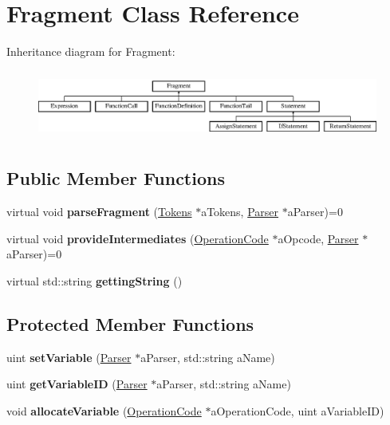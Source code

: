 \hypertarget{a00008}{\section{Fragment Class Reference}
\label{a00008}
}
Inheritance diagram for Fragment\+:\begin{figure}[H]
\begin{center}
\leavevmode
\includegraphics[height=2.295082cm]{d4/dee/a00008}
\end{center}
\end{figure}
\subsection*{Public Member Functions}
\begin{DoxyCompactItemize}
\item 
\hypertarget{a00008_a1d02e878454a0146177d80c8a8ef4b8c}{virtual void {\bfseries parse\+Fragment} (\hyperlink{a00026}{Tokens} $\ast$a\+Tokens, \hyperlink{a00017}{Parser} $\ast$a\+Parser)=0}\label{a00008_a1d02e878454a0146177d80c8a8ef4b8c}

\item 
\hypertarget{a00008_a2b367d190ab530604d1d7019d1e60612}{virtual void {\bfseries provide\+Intermediates} (\hyperlink{a00015}{Operation\+Code} $\ast$a\+Opcode, \hyperlink{a00017}{Parser} $\ast$a\+Parser)=0}\label{a00008_a2b367d190ab530604d1d7019d1e60612}

\item 
\hypertarget{a00008_a144b839eeb8c9f4dcd3ccacb81db8417}{virtual std\+::string {\bfseries getting\+String} ()}\label{a00008_a144b839eeb8c9f4dcd3ccacb81db8417}

\end{DoxyCompactItemize}
\subsection*{Protected Member Functions}
\begin{DoxyCompactItemize}
\item 
\hypertarget{a00008_ab11b535d467a5e46665f6536240eb9cc}{uint {\bfseries set\+Variable} (\hyperlink{a00017}{Parser} $\ast$a\+Parser, std\+::string a\+Name)}\label{a00008_ab11b535d467a5e46665f6536240eb9cc}

\item 
\hypertarget{a00008_a01e2bbf3887a4ade067110d1832740e4}{uint {\bfseries get\+Variable\+I\+D} (\hyperlink{a00017}{Parser} $\ast$a\+Parser, std\+::string a\+Name)}\label{a00008_a01e2bbf3887a4ade067110d1832740e4}

\item 
\hypertarget{a00008_a1fc143f43ea9a57d08a2f144bc190572}{void {\bfseries allocate\+Variable} (\hyperlink{a00015}{Operation\+Code} $\ast$a\+Operation\+Code, uint a\+Variable\+I\+D)}\label{a00008_a1fc143f43ea9a57d08a2f144bc190572}

\end{DoxyCompactItemize}


